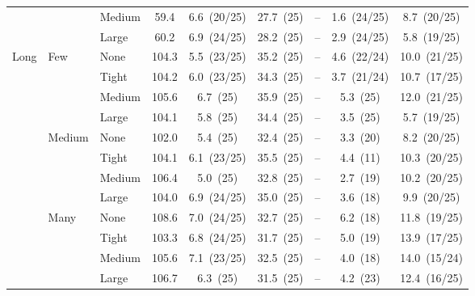 \begin{table}[htbp]
{\begin{tabular}{lll c ccccc}
 &  & {\small Medium} & 59.4 & 6.6~{\scriptsize(20/25)} & 27.7~{\scriptsize(25)} & -- & 1.6~{\scriptsize(24/25)} & 8.7~{\scriptsize(20/25)} \\
 &  & {\small Large} & 60.2 & 6.9~{\scriptsize(24/25)} & 28.2~{\scriptsize(25)} & -- & 2.9~{\scriptsize(24/25)} & 5.8~{\scriptsize(19/25)} \\
\midrule
\multirow{12}{*}{\small Long} & \multirow{4}{*}{\small Few} & {\small None} & 104.3 & 5.5~{\scriptsize(23/25)} & 35.2~{\scriptsize(25)} & -- & 4.6~{\scriptsize(22/24)} & 10.0~{\scriptsize(21/25)} \\
 &  & {\small Tight} & 104.2 & 6.0~{\scriptsize(23/25)} & 34.3~{\scriptsize(25)} & -- & 3.7~{\scriptsize(21/24)} & 10.7~{\scriptsize(17/25)} \\
 &  & {\small Medium} & 105.6 & 6.7~{\scriptsize(25)} & 35.9~{\scriptsize(25)} & -- & 5.3~{\scriptsize(25)} & 12.0~{\scriptsize(21/25)} \\
 &  & {\small Large} & 104.1 & 5.8~{\scriptsize(25)} & 34.4~{\scriptsize(25)} & -- & 3.5~{\scriptsize(25)} & 5.7~{\scriptsize(19/25)} \\
 & \multirow{4}{*}{\small Medium} & {\small None} & 102.0 & 5.4~{\scriptsize(25)} & 32.4~{\scriptsize(25)} & -- & 3.3~{\scriptsize(20)} & 8.2~{\scriptsize(20/25)} \\
 &  & {\small Tight} & 104.1 & 6.1~{\scriptsize(23/25)} & 35.5~{\scriptsize(25)} & -- & 4.4~{\scriptsize(11)} & 10.3~{\scriptsize(20/25)} \\
 &  & {\small Medium} & 106.4 & 5.0~{\scriptsize(25)} & 32.8~{\scriptsize(25)} & -- & 2.7~{\scriptsize(19)} & 10.2~{\scriptsize(20/25)} \\
 &  & {\small Large} & 104.0 & 6.9~{\scriptsize(24/25)} & 35.0~{\scriptsize(25)} & -- & 3.6~{\scriptsize(18)} & 9.9~{\scriptsize(20/25)} \\
 & \multirow{4}{*}{\small Many} & {\small None} & 108.6 & 7.0~{\scriptsize(24/25)} & 32.7~{\scriptsize(25)} & -- & 6.2~{\scriptsize(18)} & 11.8~{\scriptsize(19/25)} \\
 &  & {\small Tight} & 103.3 & 6.8~{\scriptsize(24/25)} & 31.7~{\scriptsize(25)} & -- & 5.0~{\scriptsize(19)} & 13.9~{\scriptsize(17/25)} \\
 &  & {\small Medium} & 105.6 & 7.1~{\scriptsize(23/25)} & 32.5~{\scriptsize(25)} & -- & 4.0~{\scriptsize(18)} & 14.0~{\scriptsize(15/24)} \\
 &  & {\small Large} & 106.7 & 6.3~{\scriptsize(25)} & 31.5~{\scriptsize(25)} & -- & 4.2~{\scriptsize(23)} & 12.4~{\scriptsize(16/25)} \\
\bottomrule
\end{tabular}%
}
\end{table}
